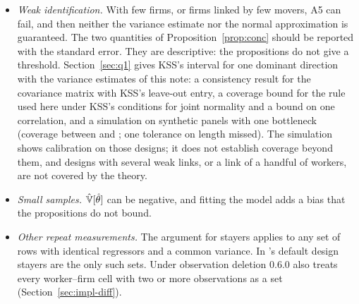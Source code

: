 \begin{itemize}
worker variance and the covariance were 10--17\% too small (Section~\ref{kss:sec:synth-varfit}); the reported $q=1$
intervals still covered 96--98\%.
\item \emph{Weak identification.} With few firms, or firms linked by few movers, A5 can fail, and then neither
the variance estimate nor the normal approximation is guaranteed. The two quantities of
Proposition~\ref{prop:conc} should be reported with the standard error. They are descriptive: the propositions
do not give a threshold. Section~\ref{sec:q1} gives KSS's interval for one dominant direction with the variance estimates of this
note: a consistency result for the covariance matrix with KSS's leave-out entry, a coverage bound for the rule
used here under KSS's conditions for joint normality and a bound on one correlation, and a simulation on
synthetic panels with one bottleneck (coverage between  and ; one tolerance on
length missed). The simulation shows calibration on those designs; it does not establish coverage beyond them,
and designs with several weak links, or a link of a handful of workers, are not covered by the theory.
\item \emph{Small samples.} $\hat{\mathbb{V}}[\hat\theta]$ can be negative, and fitting the model adds a bias that the
propositions do not bound.
\item \emph{Other repeat measurements.} The argument for stayers applies to any set of rows with identical
regressors and a common variance. In \fevc's default design stayers are the only such sets. Under observation
deletion \fevc{} 0.6.0 also treats every worker--firm cell with two or more observations as a set
(Section~\ref{sec:impl-diff}).
\end{itemize}
